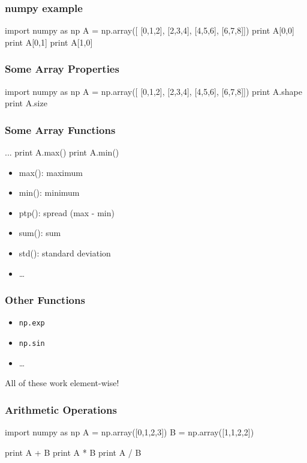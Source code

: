 \begin{frame}[fragile]
\frametitle{numpy example}

\begin{python}
import numpy as np
A = np.array([
    [0,1,2],
    [2,3,4],
    [4,5,6],
    [6,7,8]])
print A[0,0]
print A[0,1]
print A[1,0]
\end{python}

\end{frame}

\begin{frame}[fragile]
\frametitle{Some Array Properties}

\begin{python}
import numpy as np
A = np.array([
    [0,1,2],
    [2,3,4],
    [4,5,6],
    [6,7,8]])
print A.shape
print A.size
\end{python}
\end{frame}

\begin{frame}[fragile]
\frametitle{Some Array Functions}
\begin{python}
...
print A.max()
print A.min()
\end{python}

\begin{itemize}
\item max(): maximum
\item min(): minimum
\item ptp(): spread (max - min)
\item sum(): sum
\item std(): standard deviation
\item \ldots
\end{itemize}

\end{frame}

\begin{frame}[fragile]
\frametitle{Other Functions}
\begin{itemize}
\item \lstinline{np.exp}
\item \lstinline{np.sin}
\item \ldots
\end{itemize}

All of these work \alert{element-wise}!
\end{frame}

\begin{frame}[fragile]
\frametitle{Arithmetic Operations}
\begin{python}
import numpy as np
A = np.array([0,1,2,3])
B = np.array([1,1,2,2])

print A + B
print A * B
print A / B
\end{python}

\end{frame}

